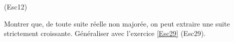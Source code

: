 \begin{tiny}(Esc12)\end{tiny} \label{Esc12} Montrer que, de toute suite réelle non majorée, on peut extraire une suite strictement croissante. Généraliser avec l'exercice \ref{Esc29} (Esc29).
